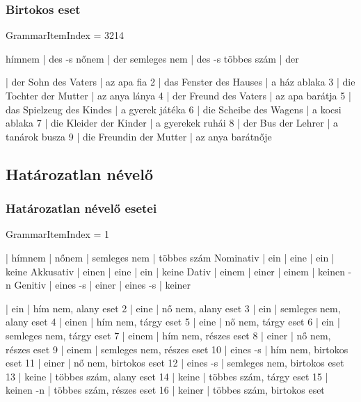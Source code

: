 \documentclass{article}
\newenvironment{desc}{\verbatim}{\endverbatim}
\newenvironment{exmp}{\verbatim}{\endverbatim}
\begin{document}
\subsubsection{Birtokos eset}

GrammarItemIndex = 3214

\begin{desc}
hímnem       | des -s
nőnem        | der
semleges nem | des -s
többes szám  | der
\end{desc}

\begin{exmp}
1 | der Sohn des Vaters | az apa fia
2 | das Fenster des Hauses | a ház ablaka
3 | die Tochter der Mutter | az anya lánya
4 | der Freund des Vaters | az apa barátja
5 | das Spielzeug des Kindes | a gyerek játéka
6 | die Scheibe des Wagens | a kocsi ablaka
7 | die Kleider der Kinder | a gyerekek ruhái
8 | der Bus der Lehrer | a tanárok busza
9 | die Freundin der Mutter | az anya barátnője
\end{exmp}

\subsection{Határozatlan névelő}

\subsubsection{Határozatlan névelő esetei}

GrammarItemIndex = 1

\begin{desc}
          | hímnem   | nőnem | semleges nem | többes szám
Nominativ | ein      | eine  | ein          | keine
Akkusativ | einen    | eine  | ein          | keine
Dativ     | einem    | einer | einem        | keinen -n
Genitiv   | eines -s | einer | eines -s     | keiner
\end{desc}

\begin{exmp}
1 | ein | hím nem, alany eset
2 | eine | nő nem, alany eset
3 | ein | semleges nem, alany eset
4 | einen | hím nem, tárgy eset
5 | eine | nő nem, tárgy eset
6 | ein | semleges nem, tárgy eset
7 | einem | hím nem, részes eset
8 | einer | nő nem, részes eset
9 | einem | semleges nem, részes eset
10 | eines -s | hím nem, birtokos eset
11 | einer | nő nem, birtokos eset
12 | eines -s | semleges nem, birtokos eset
13 | keine | többes szám, alany eset
14 | keine | többes szám, tárgy eset
15 | keinen -n | többes szám, részes eset
16 | keiner | többes szám, birtokos eset
\end{exmp}
\end{document}
